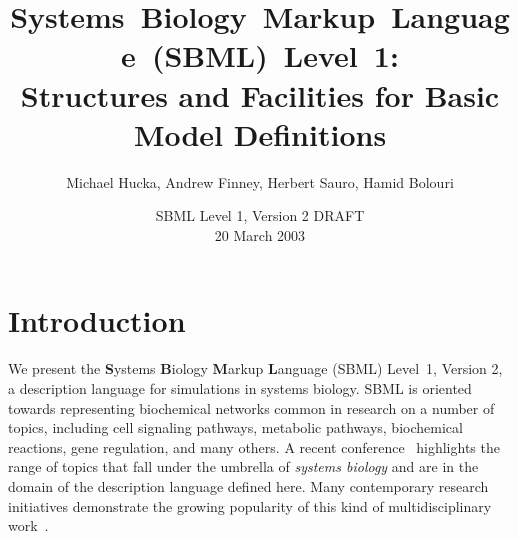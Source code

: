 \documentclass[10pt]{cekarticle}
\newcommand{\changed}[1]{\textcolor{BrickRed}{#1}}
\begin{document}

\title{\mbox{Systems Biology Markup Language (SBML) Level 1:}\\
  Structures and Facilities for Basic Model Definitions}

\author{Michael Hucka, Andrew Finney, Herbert Sauro, Hamid Bolouri}


\address{Systems Biology Workbench Development Group\\
  JST ERATO Kitano Symbiotic Systems Project\\
  Control and Dynamical Systems, MC 107-81\\
  California Institute of Technology, Pasadena, CA 91125, USA\\[3pt]
  \url{http://www.cds.caltech.edu/erato}}



\date{\vspace*{-1ex}SBML Level 1, \changed{Version 2 DRAFT}\\[3pt]
  \changed{20 March 2003}\vspace*{-10pt}}

\renewcommand{\baselinestretch}{0.96}
\maketitlepage
\renewcommand{\baselinestretch}{0.98}


\section{Introduction}
\label{sec:introduction}

We present the \textbf{S}ystems \textbf{B}iology \textbf{M}arkup
\textbf{L}anguage (SBML) Level~1\changed{, Version 2}, a description
language for simulations in systems biology.  SBML is oriented towards
representing biochemical networks common in research on a number of topics,
including cell signaling pathways, metabolic pathways, biochemical
reactions, gene regulation, and many others.  A recent
conference~\citep{kitano:2001} highlights the range of topics that fall
under the umbrella of \emph{systems biology} and are in the domain of the
description language defined here.  Many contemporary research initiatives
demonstrate the growing popularity of this kind of multidisciplinary
work~\cite[e.g.,][]{abbott:1999,gilman:2000,popel:1998,smaglik:2000,smaglik:2000b}.
\end{document}

